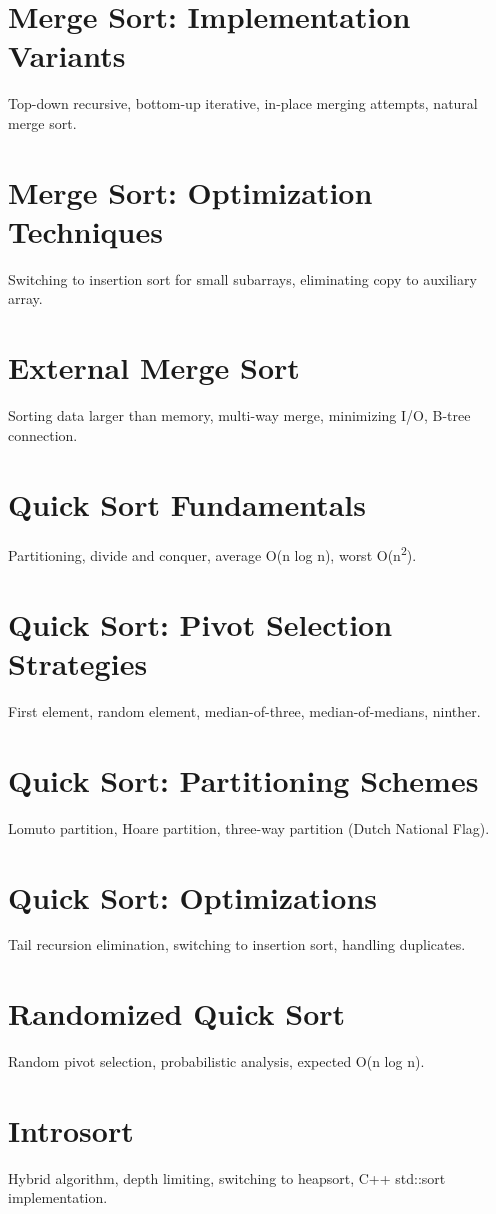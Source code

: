 \chapter{Merge Sort: Implementation Variants}
Top-down recursive, bottom-up iterative, in-place merging attempts, natural merge sort.

\chapter{Merge Sort: Optimization Techniques}
Switching to insertion sort for small subarrays, eliminating copy to auxiliary array.

\chapter{External Merge Sort}
Sorting data larger than memory, multi-way merge, minimizing I/O, B-tree connection.

\chapter{Quick Sort Fundamentals}
Partitioning, divide and conquer, average O(n log n), worst O(n\textsuperscript{2}).

\chapter{Quick Sort: Pivot Selection Strategies}
First element, random element, median-of-three, median-of-medians, ninther.

\chapter{Quick Sort: Partitioning Schemes}
Lomuto partition, Hoare partition, three-way partition (Dutch National Flag).

\chapter{Quick Sort: Optimizations}
Tail recursion elimination, switching to insertion sort, handling duplicates.

\chapter{Randomized Quick Sort}
Random pivot selection, probabilistic analysis, expected O(n log n).

\chapter{Introsort}
Hybrid algorithm, depth limiting, switching to heapsort, C++ std::sort implementation.

